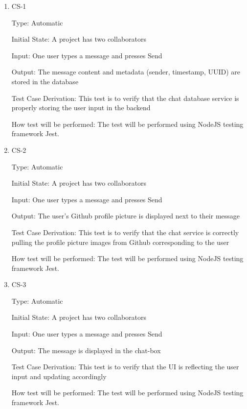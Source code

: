 \documentclass[12pt, titlepage]{article}
\begin{document}
	\begin{enumerate}
		
		\item{CS-1\\}
		
		Type: Automatic
		
		Initial State: A project has two collaborators
		
		Input: One user types a message and presses Send
		
		Output: The message content and metadata (sender, timestamp, UUID) are stored in the database
		
		Test Case Derivation: This test is to verify that the chat database service is properly storing the user input in the backend
		
		How test will be performed: The test will be performed using NodeJS testing framework Jest.
		
		\item{CS-2\\}
		
		Type: Automatic
		
		Initial State: A project has two collaborators
		
		Input: One user types a message and presses Send
		
		Output: The user's Github profile picture is displayed next to their message
		
		Test Case Derivation: This test is to verify that the chat service is correctly pulling the profile picture images from Github corresponding to the user
		
		How test will be performed: The test will be performed using NodeJS testing framework Jest.
		
		\item{CS-3\\}
		
		Type: Automatic
		
		Initial State: A project has two collaborators
		
		Input: One user types a message and presses Send
		
		Output: The message is displayed in the chat-box
		
		Test Case Derivation: This test is to verify that the UI is reflecting the user input and updating accordingly
		
		How test will be performed: The test will be performed using NodeJS testing framework Jest.
		
	\end{enumerate}
	
\end{document}
